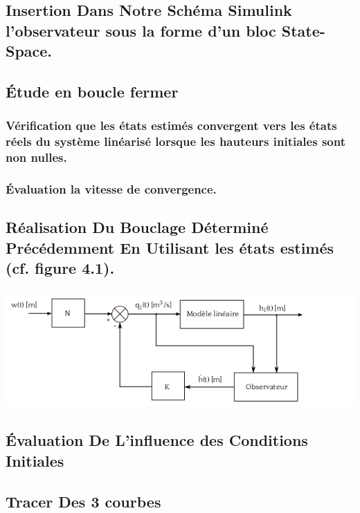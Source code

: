            
           



  
 
 
 \subsection{Insertion Dans Notre  Schéma Simulink l’observateur sous la forme d’un bloc State-Space.}
 
 
 \subsection{Étude en boucle fermer  }
  \subsubsection{ Vérification que les états estimés convergent vers les états réels du système linéarisé
lorsque les hauteurs initiales sont non nulles.}
  \subsubsection{Évaluation la vitesse de convergence.}
  
  
 \subsection{Réalisation Du Bouclage Déterminé Précédemment En Utilisant les états estimés (cf. figure 4.1).} 
 
\begin{center}
\includegraphics[scale=0.5]{fig3.png}
\label{fig3} 
\end{center}
 
 
 \subsection{Évaluation De  L’influence des Conditions Initiales}
 
 
 \subsection{Tracer  Des 3 courbes}
